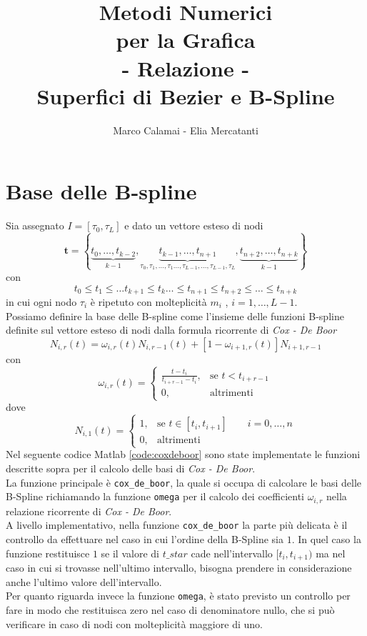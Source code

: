 \documentclass[a4paper, 12pt]{article}
\title{\textbf{\Huge Metodi Numerici\\ per la Grafica\\ \vspace{1cm}- Relazione -\\ \vspace{1cm} Superfici di Bezier e B-Spline}}
\author{Marco Calamai - Elia Mercatanti}
\begin{document}
	
\begin{titlepage}
	\maketitle
\end{titlepage}

\tableofcontents
\lstlistoflistings
\listoffigures

\newpage

\section{Base delle B-spline}

Sia assegnato $I = [\tau_0, \tau_L]$ e dato un vettore esteso di nodi
$$ \mathbf{t} =  \left\{ \underbrace{t_{0}, \dots, t_{k-2}}_{k-1}, \underbrace{t_{k-1}, \dots, t_{n+1}}_{\tau_0, \tau_1, \dots, \tau_1 \dots, \tau_{L-1}, \dots, \tau_{L-1} ,\tau_L}, \underbrace{t_{n+2}, \dots, t_{n+k}}_{k-1} \right\} $$
con
$$t_0 \leq t_1 \leq \dots t_{k+1} \leq  t_k \dots \leq  t_{n+1} \leq t_{n+2} \leq \dots \leq t_{n+k}$$
in cui ogni nodo $\tau_i$ è ripetuto con molteplicità $m_i$ , $i = 1, \dots , L-1$.\\
Possiamo definire la base delle B-spline come l'insieme delle funzioni B-spline definite sul vettore esteso di nodi dalla formula ricorrente di \textit{Cox - De Boor}
$$N_{i, r}(t) = \omega_{i,r}(t)N_{i, r-1}(t) + [1-\omega_{i+1, r}(t)]N_{i+1, r-1}$$
con
$$\omega_{i,r}(t) = \begin{cases} \frac{t-t_i}{t_{i+r-1}-t_i}, & \text{se } t<t_{i+r-1} \\ 0, & \text{altrimenti} \end{cases}$$
dove
$$N_{i, 1}(t) = \begin{cases} 1, & \text{se } t\in[t_i, t_{i+1}]\qquad i = 0, \dots, n \\ 0, & \text{altrimenti} \end{cases}$$
Nel seguente codice Matlab \ref{code:coxdeboor}  sono state implementate le funzioni descritte sopra per il calcolo delle basi di \textit{Cox - De Boor}.\\
La funzione principale è \texttt{cox\_de\_boor}, la quale si occupa di calcolare le basi delle B-Spline richiamando la funzione \texttt{omega} per il calcolo dei coefficienti $\omega_{i,r}$ nella relazione ricorrente di \textit{Cox - De Boor}.\\
A livello implementativo, nella funzione \texttt{cox\_de\_boor} la parte più delicata è il controllo da effettuare nel caso in cui l'ordine della B-Spline sia $1$. In quel caso la funzione restituisce $1$ se il valore di $t\_star$ cade nell'intervallo $[t_i, t_{i+1}) $ ma nel caso in cui si trovasse nell'ultimo intervallo, bisogna prendere in considerazione anche l'ultimo valore dell'intervallo.\\
Per quanto riguarda invece la funzione \texttt{omega}, è stato previsto un controllo per fare in modo che restituisca zero nel caso di denominatore nullo, che si può verificare in caso di nodi con molteplicità maggiore di uno.
\end{document}
